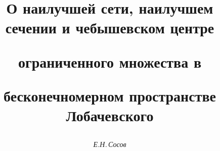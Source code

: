 









\newcommand{\ch}{\operatorname{ch}}


\newcommand{\Arch}{\operatorname{Arch}}


\newcommand{\Co}{\operatorname{Co}}


\newcommand{\tts}[1]{}







 


\setcounter{page}{42}












\author{\it Е.Н.\,Сосов}




\title{О наилучшей сети, наилучшем сечении и чебышевском центре


ограниченного множества в


бесконечномерном пространстве Лобачевского}





\date{}




\pagestyle{plain} %







\maketitle


